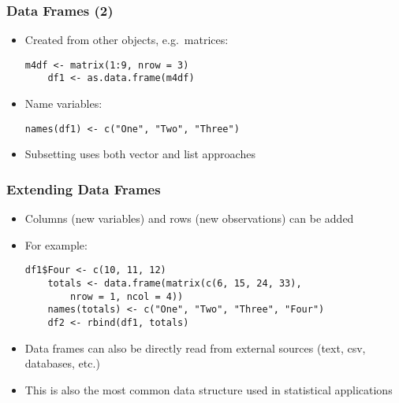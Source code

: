 \documentclass[10pt]{beamer}
\theoremstyle{definition}
\begin{document}
\begin{frame}[fragile]
\frametitle{Data Frames (2)}
\begin{itemize}
	\item Created from other objects, e.g.~matrices:
	\begin{lstlisting}[style = rstyle, breaklines]
	m4df <- matrix(1:9, nrow = 3)
	df1 <- as.data.frame(m4df)
	\end{lstlisting}

	\item Name variables:
	\begin{lstlisting}[style = rstyle, breaklines]
	names(df1) <- c("One", "Two", "Three")
	\end{lstlisting}

	\item Subsetting uses both vector and list approaches
\end{itemize}
\end{frame}

\begin{frame}[fragile]
\frametitle{Extending Data Frames}
\begin{itemize}
	\item Columns (new variables) and rows (new observations) can be added
	
	\item For example:
	\begin{lstlisting}[style = rstyle, breaklines]
	df1$Four <- c(10, 11, 12)
	totals <- data.frame(matrix(c(6, 15, 24, 33), 
		nrow = 1, ncol = 4))
	names(totals) <- c("One", "Two", "Three", "Four")
	df2 <- rbind(df1, totals)
	\end{lstlisting}
	
	\item Data frames can also be directly read from external sources (text, csv, databases, etc.)
	
	\item This is also the most common data structure used in statistical applications
\end{itemize}
\end{frame}
\end{document}
